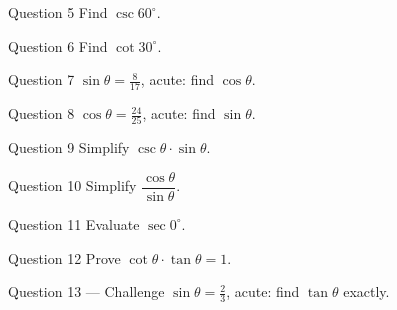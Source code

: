 \documentclass[11pt]{article}
\begin{document}
\begin{qbox}{Question 5}
Find $\csc60^\circ$.\workspace{2.4cm}
\end{qbox}

\begin{qbox}{Question 6}
Find $\cot30^\circ$.\workspace{2.4cm}
\end{qbox}

\begin{qbox}{Question 7}
$\sin\theta=\tfrac{8}{17}$, acute: find $\cos\theta$.\workspace{2.4cm}
\end{qbox}

\begin{qbox}{Question 8}
$\cos\theta=\tfrac{24}{25}$, acute: find $\sin\theta$.\workspace{2.4cm}
\end{qbox}

\begin{qbox}{Question 9}
Simplify $\csc\theta\cdot\sin\theta$.\workspace{2.4cm}
\end{qbox}

\begin{qbox}{Question 10}
Simplify $\dfrac{\cos\theta}{\sin\theta}$.\workspace{2.4cm}
\end{qbox}

\begin{qbox}{Question 11}
Evaluate $\sec0^\circ$.\workspace{2.4cm}
\end{qbox}

\begin{qbox}{Question 12}
Prove $\cot\theta\cdot\tan\theta=1$.\workspace{2.6cm}
\end{qbox}

\begin{qbox}{Question 13 --- Challenge}
$\sin\theta=\tfrac23$, acute: find $\tan\theta$ exactly.\workspace{3cm}
\end{qbox}

\clearpage
{}
\end{document}
